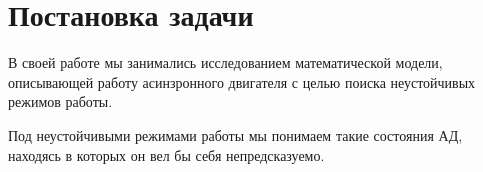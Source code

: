 \section{Постановка задачи}

В своей работе мы занимались исследованием математической модели, описывающей работу асинзронного двигателя с целью поиска неустойчивых режимов работы. 

Под неустойчивыми режимами работы мы понимаем такие состояния АД, находясь в которых он вел бы себя непредсказуемо.
